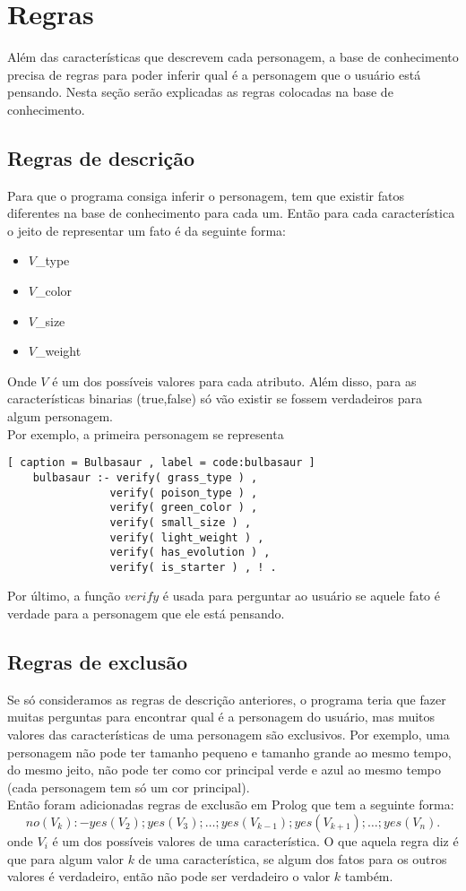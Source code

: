 \section{Regras}
\label{sec:rules}

Além das características que descrevem cada personagem, a base de conhecimento precisa de regras para poder inferir qual é a personagem que o usuário está pensando. Nesta seção serão explicadas as regras colocadas na base de conhecimento.

\subsection{Regras de descrição}
\label{subsec:description}
Para que o programa consiga inferir o personagem, tem que existir fatos diferentes na base de conhecimento para cada um. Então para cada característica o jeito de representar um fato é da seguinte forma:
	\begin{itemize}
		\item $V$\_type
		\item $V$\_color
		\item $V$\_size
		\item $V$\_weight
	\end{itemize}
Onde $V$ é um dos possíveis valores para cada atributo. Além disso, para as características binarias (true,false) só vão existir se fossem verdadeiros para algum personagem.\\
Por exemplo, a primeira personagem se representa
	\begin{lstlisting}[ caption = Bulbasaur , label = code:bulbasaur ]
	bulbasaur :- verify( grass_type ) ,
				verify( poison_type ) ,
				verify( green_color ) ,
				verify( small_size ) ,
				verify( light_weight ) ,
				verify( has_evolution ) ,
				verify( is_starter ) , ! .
	\end{lstlisting}
Por último, a função ${verify}$ é usada para perguntar ao usuário se aquele fato é verdade para a personagem que ele está pensando.

\subsection{Regras de exclusão}
\label{subsec:exclusion}

Se só consideramos as regras de descrição anteriores, o programa teria que fazer muitas perguntas para encontrar qual é a personagem do usuário, mas muitos valores das características de uma personagem são exclusivos. Por exemplo, uma personagem não pode ter tamanho pequeno e tamanho grande ao mesmo tempo, do mesmo jeito, não pode ter como cor principal verde e azul ao mesmo tempo (cada personagem tem só um cor principal).\\
Então foram adicionadas regras de exclusão em Prolog que tem a seguinte forma:
	\[ no( V_k ) :- yes( V_2 ) ; yes( V_3 ) ; \ldots ; yes( V_{k-1} ) ; yes( V_{k+1} ) ; \ldots ; yes( V_n ) . \]
onde $V_i$ é um dos possíveis valores de uma característica. O que aquela regra diz é que para algum valor $k$ de uma característica, se algum dos fatos para os outros valores é verdadeiro, então não pode ser verdadeiro o valor $k$ também.

